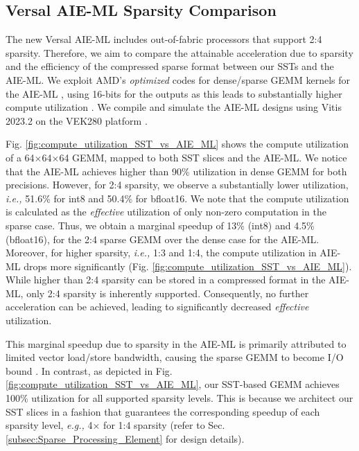 



\vspace{-0.20cm}


\subsection{Versal AIE-ML Sparsity Comparison}
\label{subsec:AIE_ML_comparison}

The new Versal AIE-ML \cite{AMD_AIE_ML_architecture_manual, AMD_AIE_ML_kernel_guide} includes out-of-fabric 
processors that support 2:4 sparsity.
Therefore, we aim to compare the attainable acceleration 
due to sparsity and the efficiency of the compressed sparse format between our SSTs and the AIE-ML.
We exploit AMD's \textit{optimized} codes 
for dense/sparse GEMM kernels for the AIE-ML \cite{AMD_dense_GEMM_int8_github, AMD_AIE_user_guide_2023.2}, using 16-bits for the outputs as this leads to substantially higher compute utilization \cite{AMD_dense_GEMM_int8_github}.
We compile and simulate the AIE-ML designs using Vitis 2023.2 on the VEK280 platform \cite{AMD_VEK_280}.




Fig. \ref{fig:compute_utilization_SST_vs_AIE_ML} shows the compute utilization of a 64$\times$64$\times$64 GEMM, mapped to both SST slices and the AIE-ML.
We notice that the AIE-ML achieves higher than 90\% utilization in dense GEMM for both precisions. 
However, for 2:4 sparsity, we observe a substantially lower utilization, \emph{i.e.,} 51.6\% for int8 and 50.4\% for bfloat16.
We note that the compute utilization is calculated as the \textit{effective} utilization of only non-zero computation in the sparse case.
Thus, we obtain a marginal speedup of 13\% (int8) and 4.5\% (bfloat16), for the 2:4 sparse GEMM over the dense case for the AIE-ML.
Moreover, for higher sparsity, \emph{i.e.,} 1:3 and 1:4, the compute utilization in AIE-ML drops more significantly (Fig. \ref{fig:compute_utilization_SST_vs_AIE_ML}).
While higher than 2:4 sparsity can be stored in a compressed format in the AIE-ML, only 2:4 sparsity is inherently supported.
Consequently, no further acceleration can be achieved, leading to significantly decreased \textit{effective} utilization.

This marginal speedup due to sparsity in the AIE-ML is primarily attributed to limited vector load/store bandwidth, causing the sparse GEMM to become I/O bound
\cite{AMD_dense_GEMM_int8_github, AMD_AIE_ML_architecture_manual}.
In contrast, as depicted in Fig. \ref{fig:compute_utilization_SST_vs_AIE_ML}, our SST-based GEMM achieves 100\% utilization for all supported sparsity levels.
This is because we architect our SST slices in a fashion that guarantees the corresponding speedup of each sparsity level, \emph{e.g.,} 4$\times$ for 1:4 sparsity (refer to Sec. \ref{subsec:Sparse_Processing_Element} for design details).




